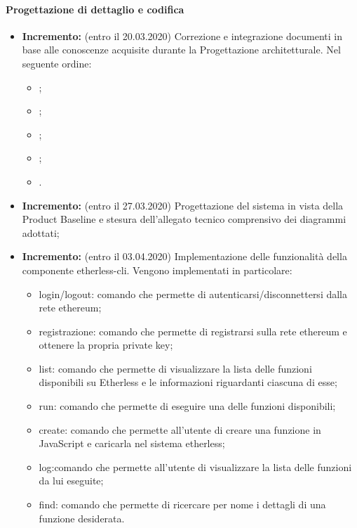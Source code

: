 \paragraph{Progettazione di dettaglio e codifica}
\begin{itemize}
	\item \textbf{ Incremento:} (entro il 20.03.2020) Correzione e integrazione documenti in base alle conoscenze acquisite durante la Progettazione architetturale. Nel seguente ordine:
  \begin{itemize}
    \item {}\docs;
    \item {}\docs;
    \item {}\docs;
    \item {}\docs;
    \item {}\docs.
  \end{itemize}
	\item \textbf{ Incremento:} (entro il 27.03.2020) Progettazione del sistema in vista della Product Baseline e stesura dell'allegato tecnico comprensivo dei diagrammi adottati;
	\item \textbf{ Incremento:} (entro il 03.04.2020) Implementazione delle funzionalità della componente etherless-cli.
  Vengono implementati in particolare:
  \begin{itemize}
    \item login/logout: comando che permette di autenticarsi/disconnettersi dalla rete ethereum;
    \item registrazione: comando che permette di registrarsi sulla rete ethereum e ottenere la propria private key;
    \item list: comando che permette di visualizzare la lista delle funzioni disponibili su Etherless e le informazioni riguardanti ciascuna di esse;
    \item run: comando che permette di eseguire una delle funzioni disponibili;
    \item create: comando che permette all'utente di creare una funzione in JavaScript e caricarla nel sistema etherless;
    \item log:comando che permette all'utente di visualizzare la lista delle funzioni da lui eseguite;
    \item find: comando che permette di ricercare per nome i dettagli di una funzione desiderata.
  \end{itemize}

\end{itemize}
